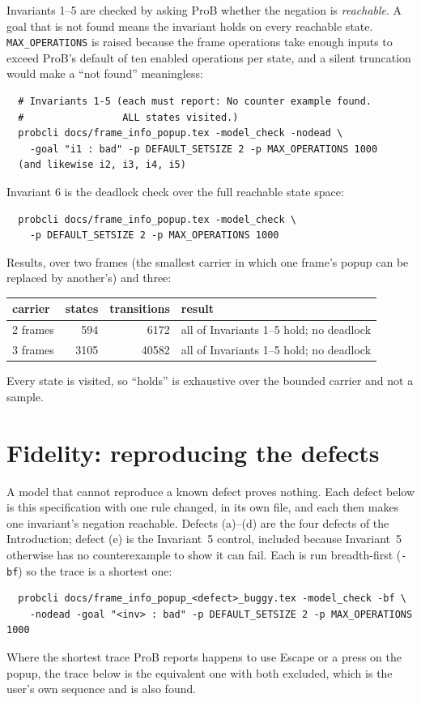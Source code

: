 \documentclass[a4paper,10pt,fleqn]{article}
\begin{document}
Invariants 1--5 are checked by asking ProB whether the negation is
\emph{reachable}.  A goal that is not found means the invariant holds on every
reachable state.  \texttt{MAX\_OPERATIONS} is raised because the frame
operations take enough inputs to exceed ProB's default of ten enabled
operations per state, and a silent truncation would make a ``not found''
meaningless:
\begin{verbatim}
  # Invariants 1-5 (each must report: No counter example found.
  #                 ALL states visited.)
  probcli docs/frame_info_popup.tex -model_check -nodead \
    -goal "i1 : bad" -p DEFAULT_SETSIZE 2 -p MAX_OPERATIONS 1000
  (and likewise i2, i3, i4, i5)
\end{verbatim}

Invariant 6 is the deadlock check over the full reachable state space:
\begin{verbatim}
  probcli docs/frame_info_popup.tex -model_check \
    -p DEFAULT_SETSIZE 2 -p MAX_OPERATIONS 1000
\end{verbatim}

Results, over two frames (the smallest carrier in which one frame's popup can
be replaced by another's) and three:
\begin{center}
\begin{tabular}{lrrl}
  carrier & states & transitions & result \\ \hline
  2 frames & 594 & 6172 & all of Invariants 1--5 hold; no deadlock \\
  3 frames & 3105 & 40582 & all of Invariants 1--5 hold; no deadlock \\
\end{tabular}
\end{center}
Every state is visited, so ``holds'' is exhaustive over the bounded carrier and
not a sample.

\section{Fidelity: reproducing the defects}
\label{sec:fidelity}

A model that cannot reproduce a known defect proves nothing.  Each defect below
is this specification with one rule changed, in its own file, and each then
makes one invariant's negation reachable.  Defects (a)--(d) are the four defects
of the Introduction; defect (e) is the Invariant~5 control, included because
Invariant~5 otherwise has no counterexample to show it can fail.  Each is run
breadth-first (\texttt{-bf}) so the trace is a shortest one:
\begin{verbatim}
  probcli docs/frame_info_popup_<defect>_buggy.tex -model_check -bf \
    -nodead -goal "<inv> : bad" -p DEFAULT_SETSIZE 2 -p MAX_OPERATIONS 1000
\end{verbatim}
Where the shortest trace ProB reports happens to use Escape or a press on the
popup, the trace below is the equivalent one with both excluded, which is the
user's own sequence and is also found.
\end{document}
